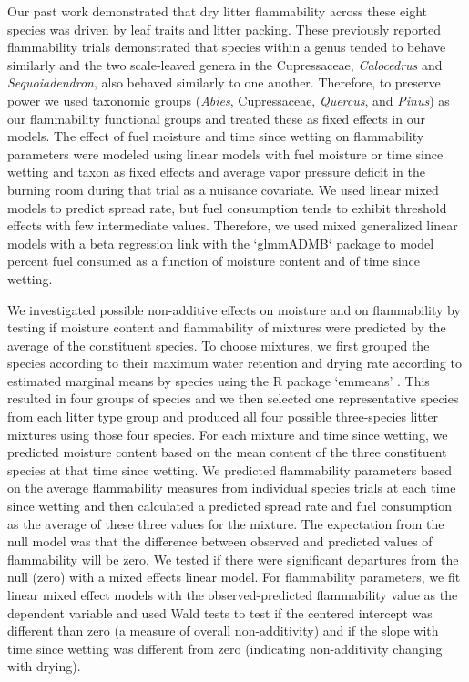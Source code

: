 \documentclass[letterpaper,12pt]{article}
\begin{document}
Our past work \citep{Magalhaes+Schwilk-2012} demonstrated that dry litter
flammability across these eight species was driven by leaf traits and litter
packing. These previously reported flammability trials demonstrated that
species within a genus tended to behave similarly and the two scale-leaved
genera in the Cupressaceae, \emph{Calocedrus} and \emph{Sequoiadendron}, also
behaved similarly to one another. Therefore, to preserve power we used taxonomic
groups (\emph{Abies}, Cupressaceae, \emph{Quercus}, and \emph{Pinus}) as our
flammability functional groups and treated these as fixed effects in our
models. The effect of fuel moisture and time since wetting on flammability
parameters were modeled using linear models with fuel moisture or time since
wetting and taxon as fixed effects and average vapor pressure deficit in the
burning room during that trial as a nuisance covariate. We used linear mixed
models to predict spread rate, but fuel consumption tends to exhibit threshold
effects with few intermediate values. Therefore, we used mixed generalized
linear models with a beta regression link with the `glmmADMB` package
\citep{Skaug_Fournier_etal-2016} to model percent fuel consumed as a function of
moisture content and of time since wetting.

We investigated possible non-additive effects on moisture and on flammability
by testing if moisture content and flammability of mixtures were predicted by
the average of the constituent species. To choose mixtures, we first grouped
the species according to their maximum water retention and drying rate
according to estimated marginal means by species using the R package `emmeans'
\citep{Lenth-2019}. This resulted in four groups of species and we then selected
one representative species from each litter type group and produced all four
possible three-species litter mixtures using those four species. For each
mixture and time since wetting, we predicted moisture content based on the mean
content of the three constituent species at that time since wetting. We
predicted flammability parameters based on the average flammability measures
from individual species trials at each time since wetting and then calculated a
predicted spread rate and fuel consumption as the average of these three values
for the mixture. The expectation from the null model was that the difference
between observed and predicted values of flammability will be zero. We tested
if there were significant departures from the null (zero) with a mixed effects
linear model. For flammability parameters, we fit linear mixed effect models
with the observed-predicted flammability value as the dependent variable and
used Wald tests to test if the centered intercept was different than zero (a
measure of overall non-additivity) and if the slope with time since wetting was
different from zero (indicating non-additivity changing with drying).
\end{document}
